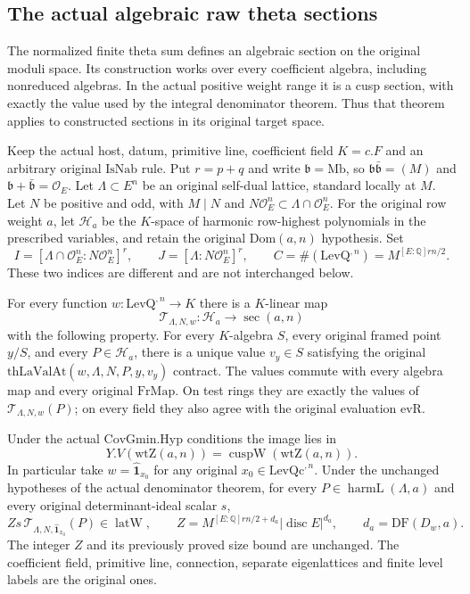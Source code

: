 \subsection{The actual algebraic raw theta sections}
\label{sec:actual-raw-theta}

The normalized finite theta sum defines an algebraic section on the
original moduli space.  Its construction works over every coefficient
algebra, including nonreduced algebras.  In the actual positive weight
range it is a cusp section, with exactly the value used by the integral
denominator theorem.  Thus that theorem applies to constructed sections
in its original target space.

Keep the actual host, datum, primitive line, coefficient field $K=c.F$
and an arbitrary original $\mathrm{IsNab}$ rule.  Put $r=p+q$ and
write $\mathfrak b=\mathrm{Mb}$, so
$\mathfrak b\bar{\mathfrak b}=(M)$ and
$\mathfrak b+\bar{\mathfrak b}=\mathcal O_E$.
Let $\Lambda\subset E^n$ be an original self-dual lattice, standard
locally at $M$.  Let $N$ be positive and odd, with
$M\mid N$ and $N\mathcal O_E^n\subset\Lambda\cap\mathcal O_E^n$.
For the original row weight $a$, let $\mathcal H_a$ be the
$K$-space of harmonic row-highest polynomials in the prescribed
variables, and retain the original $\mathrm{Dom}(a,n)$ hypothesis.
Set
\[
 I=[\Lambda\cap\mathcal O_E^n:N\mathcal O_E^n]^r,
 \qquad J=[\Lambda:N\mathcal O_E^n]^r,
 \qquad C=\#(\mathrm{LevQ}^{,n})=M^{[E:\mathbb Q]rn/2}.
\]
These two indices are different and are not interchanged below.

\begin{theorem}
\label{thm:actual-raw-theta-existence}
For every function $w:\mathrm{LevQ}^{,n}\to K$ there is a
$K$-linear map
\[
 \mathcal T_{\Lambda,N,w}:\mathcal H_a
                    \longrightarrow\operatorname{sec}(a,n)
\]
with the following property.  For every $K$-algebra $S$, every
original framed point $y/S$, and every $P\in\mathcal H_a$, there
is a unique value $v_y\in S$ satisfying the original
$\mathrm{thLaValAt}(w,\Lambda,N,P,y,v_y)$ contract.
The values commute with every algebra map and every original
$\mathrm{FrMap}$.  On test rings they are exactly the values of
$\mathcal T_{\Lambda,N,w}(P)$; on every field they also agree with
the original evaluation $\mathrm{evR}$.

Under the actual $\mathrm{CovGmin.Hyp}$ conditions the image lies in
\[
       Y.V(\mathrm{wtZ}(a,n))
           =\operatorname{cuspW}(\mathrm{wtZ}(a,n)).
\]
In particular take
$w=\widehat{\mathbf1}_{x_0}$ for any original
$x_0\in\mathrm{LevQc}^{,n}$.  Under the unchanged hypotheses of
the actual denominator theorem, for every
$P\in\operatorname{harmL}(\Lambda,a)$ and every original
determinant-ideal scalar $s$,
\[
 Zs\,\mathcal T_{\Lambda,N,\widehat{\mathbf1}_{x_0}}(P)
                 \in\operatorname{latW},
 \qquad
 Z=M^{[E:\mathbb Q]rn/2+d_a}|\operatorname{disc}E|^{d_a},
 \qquad d_a=\mathrm{DF}(D_w,a).
\]
The integer $Z$ and its previously proved size bound are unchanged.
The coefficient field, primitive line, connection, separate
eigenlattices and finite level labels are the original ones.
\end{theorem}

